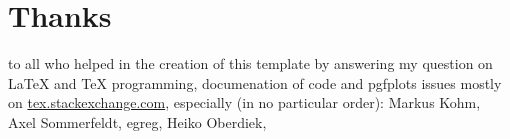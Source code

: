 \section*{Thanks}
to all who helped in the creation of this template by answering my question on LaTeX and TeX programming, documenation of code and pgfplots issues mostly on \href{http://tex.stackexchange.com}{tex.stackexchange.com}, especially (in no particular order): 
Markus Kohm, %
Axel Sommerfeldt, %
egreg, %
Heiko Oberdiek, %
